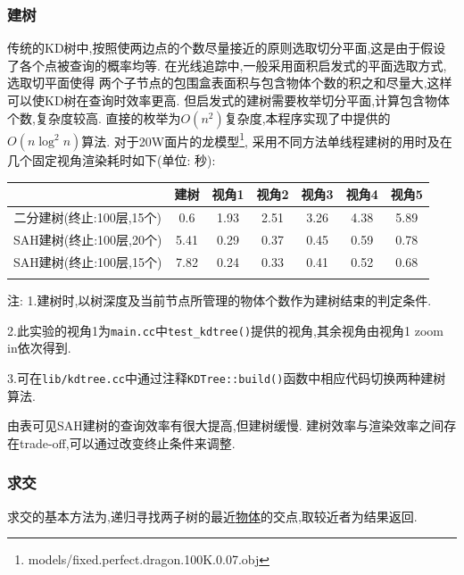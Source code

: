 \subsubsection{建树}
传统的KD树中,按照使两边点的个数尽量接近的原则选取切分平面,这是由于假设了各个点被查询的概率均等.
在光线追踪中,一般采用面积启发式的平面选取方式\cite{kdtree},选取切平面使得
两个子节点的包围盒表面积与包含物体个数的积之和尽量大,这样可以使KD树在查询时效率更高.
但启发式的建树需要枚举切分平面,计算包含物体个数,复杂度较高.
直接的枚举为$ O(n^2)$复杂度,本程序实现了\cite{kdtree}中提供的$ O(n \log^2 n)$算法.
对于20W面片的龙模型\footnote{models/fixed.perfect.dragon.100K.0.07.obj},
采用不同方法单线程建树的用时及在几个固定视角渲染耗时如下(单位: 秒):

\begin{table}[H]
  \begin{threeparttable}

    \begin{tabular}{c|c|c|c|c|c|c}
      \shline
      & 建树 & 视角1 & 视角2 & 视角3 & 视角4 & 视角5 \\ \hline
      二分建树(终止:100层,15个)  & 0.6  & 1.93  & 2.51  & 3.26  & 4.38  & 5.89  \\ \hline
      SAH建树(终止:100层,20个) & 5.41 & 0.29  & 0.37  & 0.45  & 0.59  & 0.78    \\ \hline
      SAH建树(终止:100层,15个) & 7.82 & 0.24  & 0.33  & 0.41  & 0.52  & 0.68    \\ \shline
    \end{tabular}
    \begin{tablenotes}
      \footnotesize
    \item 注: 1.建树时,以树深度及当前节点所管理的物体个数作为建树结束的判定条件.
    \item 2.此实验的视角1为\verb|main.cc|中\verb|test_kdtree()|提供的视角,其余视角由视角1 zoom in依次得到.
    \item 3.可在\verb|lib/kdtree.cc|中通过注释\verb|KDTree::build()|函数中相应代码切换两种建树算法.
    \end{tablenotes}
  \end{threeparttable}
\end{table}

由表可见SAH建树的查询效率有很大提高,但建树缓慢. 建树效率与渲染效率之间存在trade-off,可以通过改变终止条件来调整.

\subsubsection{求交}
求交的基本方法为,递归寻找两子树的最近\underline{物体}的交点,取较近者为结果返回.


